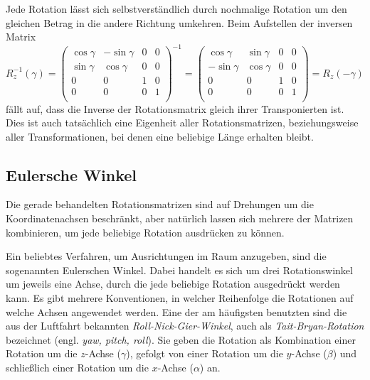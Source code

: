 Jede Rotation lässt sich selbstverständlich durch nochmalige Rotation um den gleichen Betrag in die andere Richtung umkehren. Beim Aufstellen der inversen Matrix
\begin{equation}
 R_z^{-1}{(\gamma)}
 = 
 \begin{pmatrix}
  \cos \gamma & -\sin \gamma & 0 & 0 \\
  \sin \gamma &  \cos \gamma & 0 & 0 \\
  0 & 0 & 1 & 0 \\
  0 & 0 & 0 & 1 \\
 \end{pmatrix}^{-1}
 = 
 \begin{pmatrix}
   \cos \gamma & \sin \gamma & 0 & 0 \\
  -\sin \gamma & \cos \gamma & 0 & 0 \\
  0 & 0 & 1 & 0 \\
  0 & 0 & 0 & 1 \\
 \end{pmatrix}
 = R_z{(-\gamma)}
\end{equation}
fällt auf, dass die Inverse der Rotationsmatrix gleich ihrer Transponierten ist. Dies ist auch tatsächlich eine Eigenheit aller Rotationsmatrizen, beziehungsweise aller Transformationen, bei denen eine beliebige Länge erhalten bleibt. 

\subsection{Eulersche Winkel}
Die gerade behandelten Rotationsmatrizen sind auf Drehungen um die Koordinatenachsen beschränkt, aber natürlich lassen sich mehrere der Matrizen kombinieren, um jede beliebige Rotation ausdrücken zu können.

Ein beliebtes Verfahren, um Ausrichtungen im Raum anzugeben, sind die sogenannten Eulerschen Winkel. Dabei handelt es sich um drei Rotationswinkel um jeweils eine Achse, durch die jede beliebige Rotation ausgedrückt werden kann. Es gibt mehrere Konventionen, in welcher Reihenfolge die Rotationen auf welche Achsen angewendet werden. Eine der am häufigsten benutzten sind die aus der Luftfahrt bekannten \emph{Roll-Nick-Gier-Winkel}, auch als \emph{Tait-Bryan-Rotation} bezeichnet (engl. \emph{yaw, pitch, roll}). Sie geben die Rotation als Kombination einer Rotation um die $z$-Achse ($\gamma$), gefolgt von einer Rotation um die $y$-Achse ($\beta$) und schließlich einer Rotation um die $x$-Achse ($\alpha$) an.

